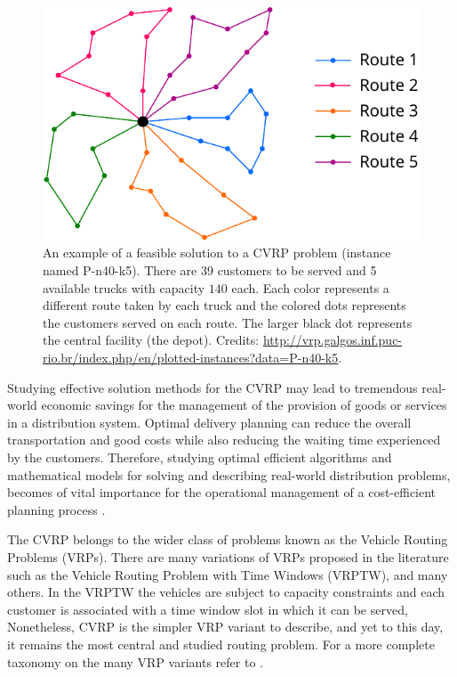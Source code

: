 \begin{figure}[ht]
	\centering
	\includegraphics[width=12cm]{Imgs/P-n40-k5-solution.out.cropped.pdf}
	\caption{An example of a feasible solution to a CVRP problem (instance named P-n40-k5).
		There are 39 customers to be served and 5 available trucks with capacity $140$ each. Each color
		represents a different route taken by each truck and the colored dots
		represents the customers served on each route.
		The larger black dot represents the central facility (the depot).
		Credits: \url{http://vrp.galgos.inf.puc-rio.br/index.php/en/plotted-instances?data=P-n40-k5}.
	}
	\label{fig:cvrp-optimal-solution-example}
\end{figure}



Studying effective solution methods for the CVRP may lead to tremendous real-world economic
savings for the management of the provision of goods or services in a distribution system.
Optimal delivery planning can reduce the overall transportation and good costs while
also reducing the waiting time experienced by the customers.
Therefore, studying optimal efficient algorithms and mathematical models for
solving and describing real-world distribution problems,
becomes of vital importance
for the operational management of a cost-efficient planning process \parencite{toth2002,toth2014}.

The CVRP belongs to the wider class of problems known as the Vehicle Routing Problems (VRPs).
There are many variations of VRPs proposed in the literature such as
the Vehicle Routing Problem with Time Windows (VRPTW), and many others.
In the VRPTW \parencite{schrage1981} the vehicles are subject to capacity constraints and
each customer is associated with a time window slot in which it can be served,
Nonetheless, CVRP is the simpler VRP variant to describe,
and yet to this day, it remains the most central and studied routing problem.
For a more complete taxonomy on the many VRP variants refer to \textcite{eksioglu2009, braekers2016}.


